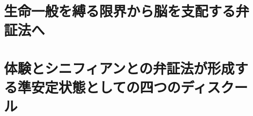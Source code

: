 



\frontmatter



\tableofcontents %

\mainmatter


\newpage

\chapter{生命一般を縛る限界から脳を支配する弁証法へ}


\newpage

\newpage



\newpage



\newpage

\newpage

\newpage


\chapter{体験とシニフィアンとの弁証法が形成する準安定状態としての四つのディスクール}


\newpage

\newpage



\newpage

\newpage

\newpage



\newpage



\newpage

\newpage


